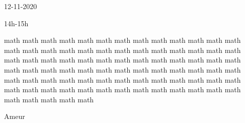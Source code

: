 \documentclass[12pt,a4paper]{article}
\newcommand{\fiche}[4]{
 \begin{minipage}[t]{2.5cm} \baselineskip=1cm \vglue -3mm\color{red}#1\end{minipage}
 \begin{minipage}[t]{2.5cm} \baselineskip=1cm \vglue -3mm\color{green}#2\end{minipage}
 \begin{minipage}[t]{9cm} \baselineskip=1cm \vglue -3mm \color{blue}#3\end{minipage}
 \qquad\begin{minipage}[t]{2.5cm} \baselineskip=1cm \vglue -3mm\color{violet}#4\end{minipage}
}
\begin{document}
 
 \baselineskip=1cm \vglue -3mm
 \fiche{12-11-2020}{14h-15h}
 {math math math math math math math math math math math 
  math math math math math math math math math
  math math math math math math math math math
  math math math math math math math math math
  math math math math math math math math math
  math math math math math math math math math
  math math math math math math math math math
  math math math math math math math math math
  math math math math math math math math math  }
 {Ameur}
\end{document}
